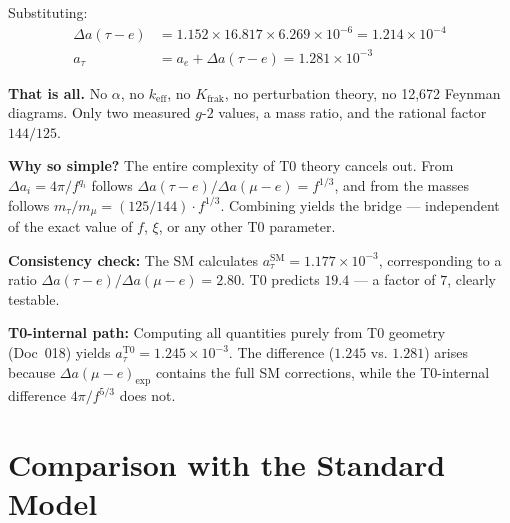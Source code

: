 Substituting:
\begin{align}
	\Delta a(\tau{-}e) &= 1.152 \times 16.817 \times 6.269 \times 10^{-6} = 1.214 \times 10^{-4} \\
	a_\tau &= a_e + \Delta a(\tau{-}e) = \boxed{1.281 \times 10^{-3}}
	\label{eq:taupred}
\end{align}

\textbf{That is all.} No $\alpha$, no $k_\text{eff}$, no $K_\text{frak}$, no perturbation theory, no 12,672 Feynman diagrams. Only two measured $g$-$2$ values, a mass ratio, and the rational factor $144/125$.

\textbf{Why so simple?} The entire complexity of T0 theory cancels out. From $\Delta a_i = 4\pi/f^{q_i}$ follows $\Delta a(\tau{-}e)/\Delta a(\mu{-}e) = f^{1/3}$, and from the masses follows $m_\tau/m_\mu = (125/144) \cdot f^{1/3}$. Combining yields the bridge --- independent of the exact value of $f$, $\xi$, or any other T0 parameter.

\textbf{Consistency check:} The SM calculates $a_\tau^\text{SM} = 1.177 \times 10^{-3}$, corresponding to a ratio $\Delta a(\tau{-}e)/\Delta a(\mu{-}e) = 2.80$. T0 predicts $19.4$ --- a factor of $7$, clearly testable.

\textbf{T0-internal path:} Computing all quantities purely from T0 geometry (Doc~018) yields $a_\tau^\text{T0} = 1.245 \times 10^{-3}$. The difference ($1.245$ vs. $1.281$) arises because $\Delta a(\mu{-}e)_\text{exp}$ contains the full SM corrections, while the T0-internal difference $4\pi/f^{5/3}$ does not.

\begin{table}[h]
	\centering
	\caption{Tau predictions: T0 vs. SM}
	\label{tab:taupred}
\end{table}

\section{Comparison with the Standard Model}
\label{sec:comparison}

